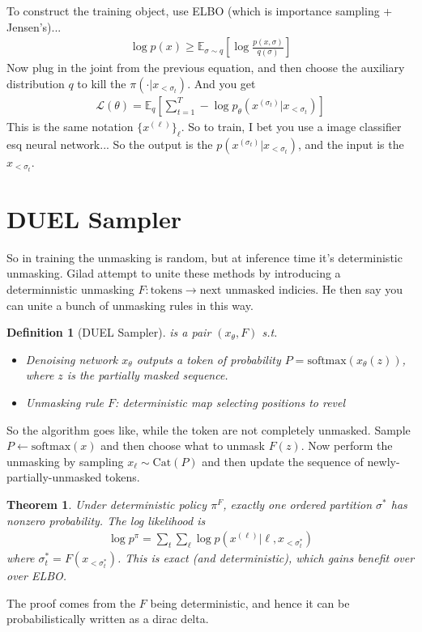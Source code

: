 \documentclass[12pt,fleqn]{article}
\numberwithin{equation}{section} %
\newtheorem{theorem}{Theorem}
\newtheorem{definition}{Definition}
\begin{document}
To construct the training object, use ELBO (which is importance sampling + Jensen's)...
\begin{align}
	\log p(x) \geq \mathbb E_{\sigma \sim q} \left[ \log \frac{p(x,\sigma)}{q(\sigma)} \right]
\end{align}
Now plug in the joint from the previous equation, and then choose the auxiliary distribution $q$ to kill the $\pi(\cdot | x_{< \sigma_t})$. And you get
\begin{align}
	\mathcal L(\theta) = \mathbb E_{q}\left[ \sum_{t=1}^T - \log p_\theta(x^{(\sigma_t)} | x_{< \sigma_t}) \right]
\end{align}
This is the same notation $\{x^{(\ell)}\}_\ell$. So to train, I bet you use a image classifier esq neural network... So the output is the $p(x^{(\sigma_t)} | x_{< \sigma_t})$, and the input is the $x_{< \sigma_t}$. 

\section{DUEL Sampler}
So in training the unmasking is random, but at inference time it's deterministic unmasking. Gilad attempt to unite these methods by introducing a determinnistic unmasking $F: \text{tokens} \to \text{next unmasked indicies}$. He then say you can unite a bunch of unmasking rules in this way.

\begin{definition}
	[DUEL Sampler] is a pair $(x_\theta,F)$ s.t.
	\begin{itemize}
		\item Denoising network $x_\theta$ outputs a token of probability $P = \text{softmax}(x_\theta(z))$, where $z$ is the partially masked sequence.
		\item Unmasking rule $F$: deterministic map selecting positions to revel
	\end{itemize}
\end{definition}
So the algorithm goes like, while the token are not completely unmasked. Sample $P \leftarrow \text{softmax}(x)$ and then choose what to unmask $F(z)$. Now perform the unmasking by sampling $x_\ell \sim \text{Cat}(P)$ and then update the sequence of newly-partially-unmasked tokens.

\begin{theorem}
	Under deterministic policy $\pi^F$, exactly one ordered partition $\sigma^*$ has nonzero probability. The log likelihood is
	\begin{align}
		\log p^\pi = \sum_t \sum_\ell \log p(x^{(\ell)} | \ell, x_{< \sigma_t^*})
	\end{align}
	where $\sigma_t^* = F(x_{<\sigma_t^*})$. This is exact (and deterministic), which gains benefit over over ELBO.
\end{theorem}
The proof comes from the $F$ being deterministic, and hence it can be probabilistically written as a dirac delta.
\end{document}
